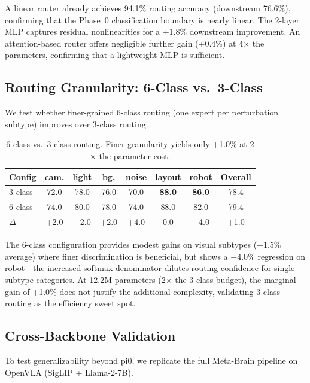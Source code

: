 \documentclass[conference]{article}
\newcommand{\ours}{Meta-Brain}
\begin{document}
A linear router already achieves 94.1\% routing accuracy (downstream 76.6\%), confirming that the Phase~0 classification boundary is nearly linear.
The 2-layer MLP captures residual nonlinearities for a +1.8\% downstream improvement.
An attention-based router offers negligible further gain (+0.4\%) at 4$\times$ the parameters, confirming that a lightweight MLP is sufficient.

\subsection{Routing Granularity: 6-Class vs.\ 3-Class}
\label{sec:granularity}

We test whether finer-grained 6-class routing (one expert per perturbation subtype) improves over 3-class routing.

\begin{table}[h]
\centering
\caption{6-class vs.\ 3-class routing. Finer granularity yields only +1.0\% at 2$\times$ the parameter cost.}
\label{tab:granularity}
\small
\begin{tabular}{lcccccc|c}
\toprule
Config & cam. & light & bg. & noise & layout & robot & Overall \\
\midrule
3-class & 72.0 & 78.0 & 76.0 & 70.0 & \textbf{88.0} & \textbf{86.0} & 78.4 \\
6-class & 74.0 & 80.0 & 78.0 & 74.0 & 88.0 & 82.0 & 79.4 \\
$\Delta$ & +2.0 & +2.0 & +2.0 & +4.0 & 0.0 & $-$4.0 & +1.0 \\
\bottomrule
\end{tabular}
\end{table}

The 6-class configuration provides modest gains on visual subtypes (+1.5\% average) where finer discrimination is beneficial, but shows a $-$4.0\% regression on robot---the increased softmax denominator dilutes routing confidence for single-subtype categories.
At 12.2M parameters (2$\times$ the 3-class budget), the marginal gain of +1.0\% does not justify the additional complexity, validating 3-class routing as the efficiency sweet spot.

\subsection{Cross-Backbone Validation}
\label{sec:cross_backbone}

To test generalizability beyond pi0, we replicate the full \ours{} pipeline on OpenVLA (SigLIP + Llama-2-7B).
\end{document}
